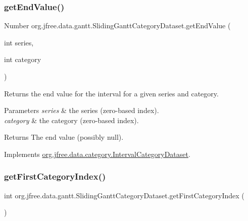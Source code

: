 \subsubsection{\texorpdfstring{get\+End\+Value()}{getEndValue()}\hspace{0.1cm}{\footnotesize\ttfamily [4/4]}}
{\footnotesize\ttfamily Number org.\+jfree.\+data.\+gantt.\+Sliding\+Gantt\+Category\+Dataset.\+get\+End\+Value (\begin{DoxyParamCaption}\item[{int}]{series,  }\item[{int}]{category }\end{DoxyParamCaption})}

Returns the end value for the interval for a given series and category.


\begin{DoxyParams}{Parameters}
{\em series} & the series (zero-\/based index). \\
\hline
{\em category} & the category (zero-\/based index).\\
\hline
\end{DoxyParams}
\begin{DoxyReturn}{Returns}
The end value (possibly {\ttfamily null}). 
\end{DoxyReturn}


Implements \mbox{\hyperlink{interfaceorg_1_1jfree_1_1data_1_1category_1_1_interval_category_dataset_af83cb9f655ea175391fed773b2e478cb}{org.\+jfree.\+data.\+category.\+Interval\+Category\+Dataset}}.

\mbox{\label{classorg_1_1jfree_1_1data_1_1gantt_1_1_sliding_gantt_category_dataset_a01a38818aad9ad8d78ea3554f10bb6b8}} 
\subsubsection{\texorpdfstring{get\+First\+Category\+Index()}{getFirstCategoryIndex()}}
{\footnotesize\ttfamily int org.\+jfree.\+data.\+gantt.\+Sliding\+Gantt\+Category\+Dataset.\+get\+First\+Category\+Index (\begin{DoxyParamCaption}{ }\end{DoxyParamCaption})}

